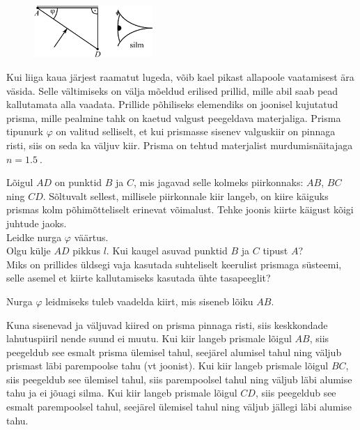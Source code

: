 
\begin{figure}
 \begin{center}
 \includegraphics[width=0.4\textwidth]{2014-v3g-04-periskoopprillid_yl_joonis.pdf}
 \end{center}
\end{figure}

Kui liiga kaua järjest raamatut lugeda, võib kael pikast allapoole vaatamisest ära väsida. Selle vältimiseks on välja mõeldud erilised prillid, mille abil saab pead kallutamata alla vaadata. Prillide põhiliseks elemendiks on joonisel kujutatud prisma, mille pealmine tahk on kaetud valgust peegeldava materjaliga. Prisma tipunurk $\varphi$ on valitud selliselt, et kui prismasse sisenev valguskiir on pinnaga risti, siis on seda ka väljuv kiir. Prisma on tehtud materjalist murdumisnäitajaga $n=\SI{1,5}{}$. 

\osa Lõigul $AD$ on punktid $B$ ja $C$, mis jagavad selle kolmeks piirkonnaks: $AB$, $BC$ ning $CD$. Sõltuvalt sellest, millisele piirkonnale kiir langeb, on kiire käiguks prismas kolm põhimõtteliselt erinevat võimalust. Tehke joonis kiirte käigust kõigi juhtude jaoks.\\
\osa Leidke nurga $\varphi$ väärtus.\\
\osa Olgu külje $AD$ pikkus $l$. Kui kaugel asuvad punktid $B$ ja $C$ tipust $A$?\\
\osa Miks on prillides üldsegi vaja kasutada suhteliselt keerulist prismaga süsteemi, selle asemel et kiirte kallutamiseks kasutada ühte tasapeeglit?

\hint
Nurga $\varphi$ leidmiseks tuleb vaadelda kiirt, mis siseneb lõiku $AB$.

\solu
\osa Kuna sisenevad ja väljuvad kiired on prisma pinnaga risti, siis keskkondade lahutuspiiril nende suund ei muutu. Kui kiir langeb prismale lõigul $AB$, siis peegeldub see esmalt prisma ülemisel tahul, seejärel alumisel tahul ning väljub prismast läbi parempoolse tahu (vt joonist). Kui kiir langeb prismale lõigul $BC$, siis peegeldub see ülemisel tahul, siis parempoolsel tahul ning väljub läbi alumise tahu ja ei jõuagi silma. Kui kiir langeb prismale lõigul $CD$, siis peegeldub see esmalt parempoolsel tahul, seejärel ülemisel tahul ning väljub jällegi läbi alumise tahu.

